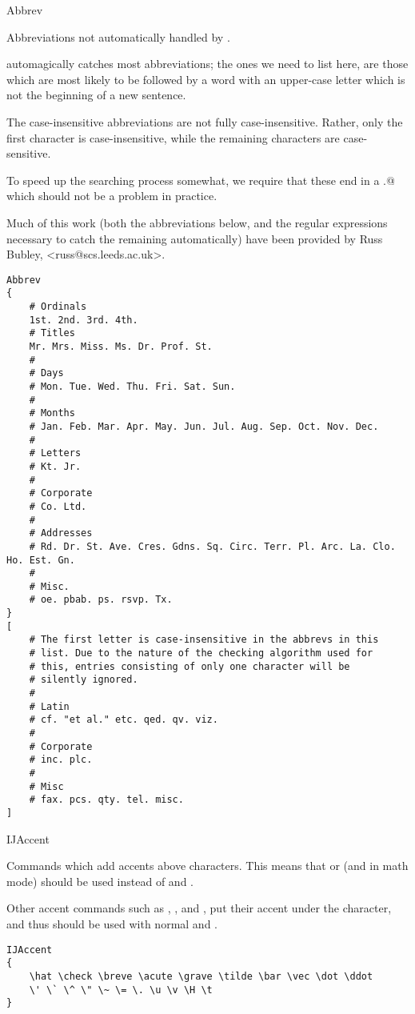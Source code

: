 \begin{chktexrclistvar*}{Abbrev}

Abbreviations not automatically handled by \chktex{}.

\chktex{} automagically catches most abbreviations; the ones we need to
list here, are those which are most likely to be followed by a word
with an upper-case letter which is not the beginning of a new
sentence.

The case-insensitive abbreviations are not fully case-insensitive.
Rather, only the first character is case-insensitive, while the
remaining characters are case-sensitive.

To speed up the searching process somewhat, we require that these
end in a \verb@.@ which should not be a problem in practice.

Much of this work (both the abbreviations below, and the regular
expressions necessary to catch the remaining automatically) have
been provided by Russ Bubley, <russ@scs.leeds.ac.uk>.

\chktexrcdefault\begin{verbatim}
Abbrev
{
    # Ordinals
    1st. 2nd. 3rd. 4th.
    # Titles
    Mr. Mrs. Miss. Ms. Dr. Prof. St.
    #
    # Days
    # Mon. Tue. Wed. Thu. Fri. Sat. Sun.
    #
    # Months
    # Jan. Feb. Mar. Apr. May. Jun. Jul. Aug. Sep. Oct. Nov. Dec.
    #
    # Letters
    # Kt. Jr.
    #
    # Corporate
    # Co. Ltd.
    #
    # Addresses
    # Rd. Dr. St. Ave. Cres. Gdns. Sq. Circ. Terr. Pl. Arc. La. Clo. Ho. Est. Gn.
    #
    # Misc.
    # oe. pbab. ps. rsvp. Tx.
}
[
    # The first letter is case-insensitive in the abbrevs in this
    # list. Due to the nature of the checking algorithm used for
    # this, entries consisting of only one character will be
    # silently ignored.
    #
    # Latin
    # cf. "et al." etc. qed. qv. viz.
    #
    # Corporate
    # inc. plc.
    #
    # Misc
    # fax. pcs. qty. tel. misc.
]
\end{verbatim}
\end{chktexrclistvar*}


\begin{chktexrclistvar}{IJAccent}

Commands which add accents above characters.  This means that \verb@\i@ or \verb@\j@
(\verb@\imath@ and \verb@\jmath@ in math mode) should be used instead of \verb@i@ and \verb@j@.

Other accent commands such as \verb@\c@, \verb@\d@, and \verb@\b@, put their accent under
the character, and thus should be used with normal \verb@i@s and \verb@j@s.

\chktexrcdefault\begin{verbatim}
IJAccent
{
    \hat \check \breve \acute \grave \tilde \bar \vec \dot \ddot
    \' \` \^ \" \~ \= \. \u \v \H \t
}
\end{verbatim}
\end{chktexrclistvar}


